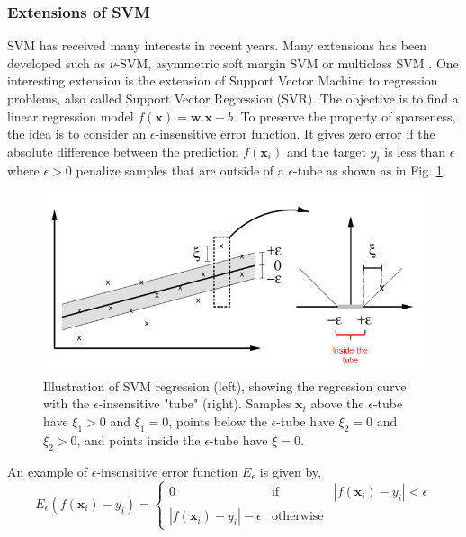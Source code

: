 \subsubsection{Extensions of SVM}
SVM has received many interests in recent years. Many extensions has been developed such as $\nu$-SVM, asymmetric soft margin SVM or multiclass SVM \cite{Kijsirikul2002,Crammer2001}. One interesting extension is the extension of Support Vector Machine to regression problems, also called Support Vector Regression (SVR). The objective is to find a linear regression model $f(\textbf{x})=\textbf{w}.\textbf{x}+b$. To preserve the property of sparseness, the idea is to consider an $\epsilon$-insensitive error function. It gives zero error if the absolute difference between
the prediction $f(\textbf{x}_i)$ and the target $y_i$ is less than $\epsilon$ where $\epsilon > 0$ penalize samples that are outside of a $\epsilon$-tube as shown as in Fig. \ref{fig:SVR_tube}.

\begin{figure}[h!]
\centering
\includegraphics[width=0.8\linewidth]{images/SVR_tube}
\caption{Illustration of SVM regression (left), showing the regression curve with the $\epsilon$-insensitive "tube" (right). Samples $\textbf{x}_i$ above the $\epsilon$-tube have $\xi_1 > 0$ and $\xi_1 = 0$, points below the $\epsilon$-tube have $\xi_2 = 0$ and $\xi_2 > 0$, and points inside the $\epsilon$-tube have $\xi = 0$.}
\label{fig:SVR_tube}
\end{figure}

\noindent An example of $\epsilon$-insensitive error function $E_{\epsilon}$ is given by,
\begin{equation}
E_{\epsilon} (f(\textbf{x}_i)-y_i) =
\left\lbrace
\begin{array}{lll}
0  								& \mbox{if} 		& |f(\textbf{x}_i)-y_i| < \epsilon\\
|f(\textbf{x}_i)-y_i|-\epsilon 	& \mbox{otherwise}  & 
\end{array}\right.
\end{equation}


